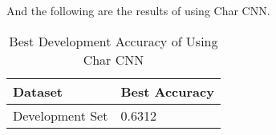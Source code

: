 \documentclass{article}
\begin{document}
And the following are the results of using Char CNN. 

\begin{table}[htb]
	\caption{Best Development Accuracy of Using Char CNN}
	\label{sample-table}
	\centering
	\begin{tabular}{ll}
		\toprule
		\cmidrule{1-2}
		Dataset & Best Accuracy\\
		\midrule
		Development Set & 0.6312  \\
		\bottomrule
	\end{tabular}
\end{table}
\end{document}
